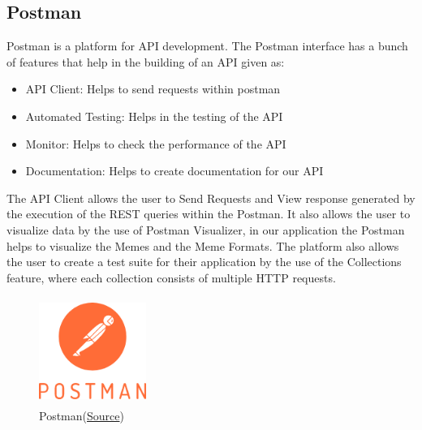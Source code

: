 \documentclass[12pt]{article}
\begin{document}
\subsection{Postman}
Postman is a platform for \ac{API} development. The Postman interface has a bunch of features that help in the building of an \ac{API} given as:
\begin{itemize}
    \item API Client: Helps to send requests within postman
    \item Automated Testing: Helps in the testing of the API
    \item Monitor: Helps to check the performance of the API
    \item Documentation: Helps to create documentation for our API
\end{itemize}
\begin{flushleft}
The \ac{API} Client allows the user to Send Requests and View response generated by the execution of the REST queries within the Postman. It also allows the user to visualize data by the use of Postman Visualizer, in our application the Postman helps to visualize the Memes and the Meme Formats. The platform also allows the user to create a test suite for their application by the use of the Collections feature, where each collection consists of multiple HTTP requests.
\end{flushleft}
\begin{figure}[H]
    \centering
    \includegraphics[width=3.5cm, height=3.5cm]{../report_MemeEcon/images/postman.png}
    \caption{Postman(\href{https://www.postman.com/resources/media-assets/}{Source})}
    \label{fig:Postman}
\end{figure}
\end{document}
